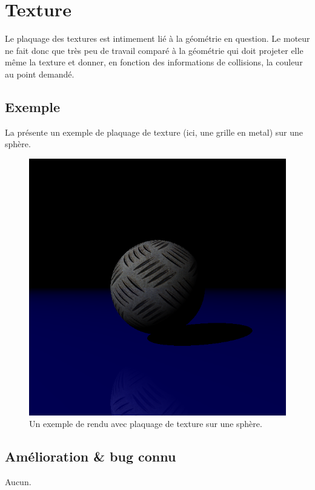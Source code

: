 \section{Texture}
Le plaquage des textures est intimement lié à la géométrie en question. Le
moteur ne fait donc que très peu de travail comparé à la géométrie qui doit
projeter elle même la texture et donner, en fonction des informations de
collisions, la couleur au point demandé. 


\subsection{Exemple}
La  présente un exemple de plaquage de texture
(ici, une grille en metal) sur une sphère.

\begin{figure}[h]
  \begin{center}
    \includegraphics[width=.5\textwidth, keepaspectratio=true]{../../diary/17.png}
    \caption{Un exemple de rendu avec plaquage de texture\label{fig:texture} sur
    une sphère.}
  \end{center}
\end{figure}

\subsection{Amélioration \& bug connu}
Aucun.
